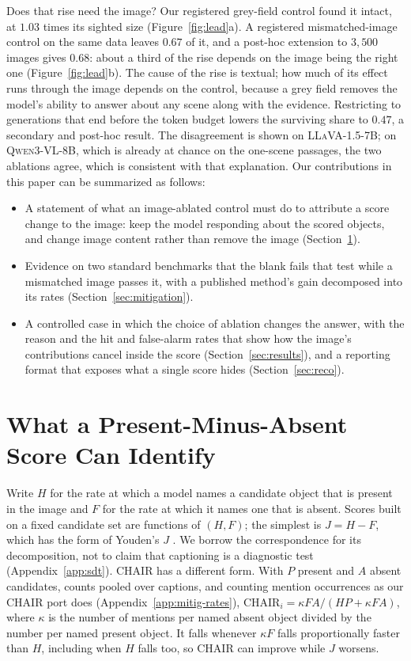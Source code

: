 \documentclass{article} %
\begin{document}
Does that rise need the image? Our registered grey-field control found it intact, at $1.03$ times its
sighted size (Figure~\ref{fig:lead}a). A registered mismatched-image control on the same data leaves
$0.67$ of it, and a post-hoc extension to $3{,}500$ images gives $0.68$: about a third of the rise
depends on the image being the right one (Figure~\ref{fig:lead}b). The cause of the rise is textual;
how much of its effect runs through the image depends on the control, because a grey field removes the
model's ability to answer about any scene along with the evidence. Restricting to generations that end
before the token budget lowers the surviving share to $0.47$, a secondary and post-hoc result. The
disagreement is shown on \textsc{LLaVA-1.5-7B}; on \textsc{Qwen3-VL-8B}, which is already at chance on
the one-scene passages, the two ablations agree, which is consistent with that explanation. Our
contributions in this paper can be summarized as follows:

\begin{itemize}
\item A statement of what an image-ablated control must do to attribute a score change to the image: keep the model responding about the scored objects, and change image content rather than remove the image (Section~\ref{sec:theory}).

\item Evidence on two standard benchmarks that the blank fails that test while a mismatched image passes it, with a published method's gain decomposed into its rates (Section~\ref{sec:mitigation}).

\item A controlled case in which the choice of ablation changes the answer, with the reason and the hit and false-alarm rates that show how the image's contributions cancel inside the score (Section~\ref{sec:results}), and a reporting
format that exposes what a single score hides (Section~\ref{sec:reco}).
\end{itemize}

\section{What a Present-Minus-Absent Score Can Identify}
\label{sec:theory}

Write $H$ for the rate at which a model names a candidate object that is present in the image and
$F$ for the rate at which it names one that is absent. Scores built on a fixed candidate set are
functions of $(H, F)$; the simplest is $J = H - F$, which has the form of Youden's $J$
\citep{youden1950}. We borrow the correspondence for its decomposition, not to claim that captioning
is a diagnostic test (Appendix~\ref{app:sdt}). CHAIR has a different form. With $P$ present and $A$
absent candidates, counts pooled over captions, and counting mention occurrences as our CHAIR port does
(Appendix~\ref{app:mitig-rates}), $\mathrm{CHAIR}_i = \kappa FA/(HP + \kappa FA)$, where $\kappa$ is
the number of mentions per named absent object divided by the number per named present object. It
falls whenever $\kappa F$ falls proportionally faster than $H$, including when $H$ falls too, so CHAIR
can improve while $J$ worsens.
\end{document}
